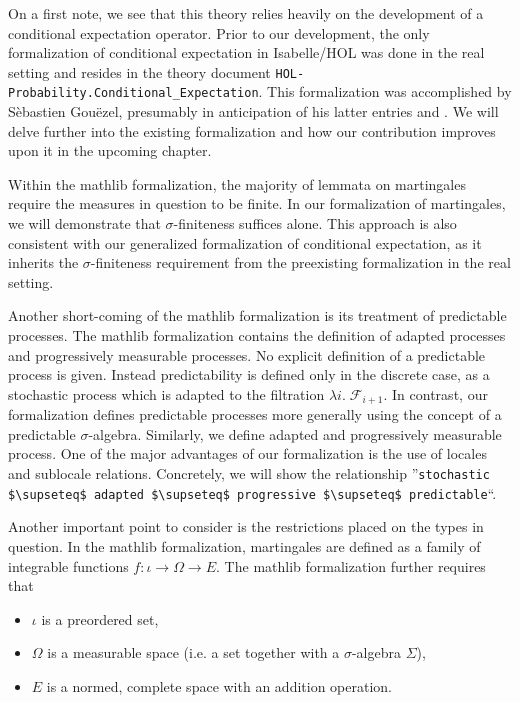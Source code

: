 On a first note, we see that this theory relies heavily on the development of a conditional expectation operator. Prior to our development, the only formalization of conditional expectation in Isabelle/HOL was done in the real setting and resides in the theory document \texttt{HOL-Probability.Conditional\_Expectation}. This formalization was accomplished by S\`ebastien Gou\"ezel, presumably in anticipation of his latter entries \cite{Ergodic_Theory-AFP} and \cite{Lp-AFP}. We will delve further into the existing formalization and how our contribution improves upon it in the upcoming chapter.

Within the \textsf{mathlib} formalization, the majority of lemmata on martingales require the measures in question to be finite. In our formalization of martingales, we will demonstrate that $\sigma$-finiteness suffices alone. This approach is also consistent with our generalized formalization of conditional expectation, as it inherits the $\sigma$-finiteness requirement from the preexisting formalization in the real setting.

Another short-coming of the \textsf{mathlib} formalization is its treatment of predictable processes. The \textsf{mathlib} formalization contains the definition of adapted processes and progressively measurable processes. No explicit definition of a predictable process is given. Instead predictability is defined only in the discrete case, as a stochastic process which is adapted to the filtration $\lambda i. \; \mathcal{F}_{i + 1}$. In contrast, our formalization defines predictable processes more generally using the concept of a predictable $\sigma$-algebra. Similarly, we define adapted and progressively measurable process. One of the major advantages of our formalization is the use of locales and sublocale relations. Concretely, we will show the relationship ''\lstinline[mathescape]{stochastic $\supseteq$ adapted $\supseteq$ progressive $\supseteq$ predictable}``.

Another important point to consider is the restrictions placed on the types in question. In the \textsf{mathlib} formalization, martingales are defined as a family of integrable functions $f : \iota \rightarrow \Omega \rightarrow E$. The \textsf{mathlib} formalization further requires that
\begin{itemize}
\item $\iota$ is a preordered set, 
\item $\Omega$ is a measurable space (i.e. a set together with a $\sigma$-algebra $\Sigma$),
\item $E$ is a normed, complete space with an addition operation.
\end{itemize}

